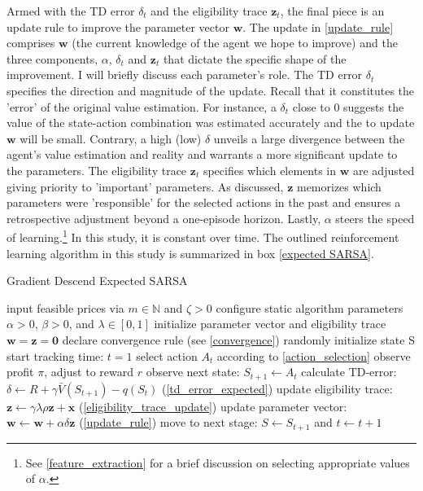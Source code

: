 Armed with the TD error $\delta_t$ and the eligibility trace $\boldsymbol{z}_t$, the final piece is an update rule to improve the parameter vector $\boldsymbol{w}$. The update in \autoref{update_rule} comprises $\boldsymbol{w}$  (the current knowledge of the agent we hope to improve) and the three components, $\alpha$, $\delta_t$ and $\boldsymbol{z}_t$ that dictate the specific shape of the improvement. I will briefly discuss each parameter's role. The TD error $\delta_t$ specifies the direction and magnitude of the update. Recall that it constitutes the 'error' of the original value estimation. For instance, a $\delta_t$ close to 0 suggests the value of the state-action combination was estimated accurately and the to update $\boldsymbol{w}$ will be small. Contrary, a high (low) $\delta$ unveils a large divergence between the agent's value estimation and reality and warrants a more significant update to the parameters. The eligibility trace $\boldsymbol{z}_t$ specifies which elements in $\boldsymbol{w}$ are adjusted giving priority to 'important' parameters. As discussed, $\boldsymbol{z}$ memorizes which parameters were 'responsible' for the selected actions in the past and ensures a retrospective adjustment beyond a one-episode horizon. Lastly, $\alpha$ steers the speed of learning.\footnote{See \autoref{feature_extraction} for a brief discussion on selecting appropriate values of $\alpha$.} In this study, it is constant over time. The outlined reinforcement learning algorithm in this study is summarized in box \autoref{expected SARSA}.

\begin{algorithm}
	\caption{Gradient Descend Expected SARSA}
	\begin{algorithmic}[testing]
		\label{expected SARSA}
		\small
		\STATE input feasible prices via $m \in \mathbb{N}$ and $\zeta > 0$
		\STATE configure static algorithm parameters $\alpha > 0$, $\beta > 0$, and $\lambda \in [0, 1]$
		\STATE initialize parameter vector and eligibility trace $\boldsymbol{w} = \boldsymbol{z} = \boldsymbol{0}$
		\STATE declare convergence rule (see \autoref{convergence})
		\STATE randomly initialize state S
		\STATE start tracking time: $t = 1$
		\STATE select action $A_t$ according to \autoref{action_selection}
		\STATE observe profit $\pi$, adjust to reward $r$
		\STATE observe next state: $S_{t+1} \leftarrow A_t$
		\STATE calculate TD-error: $\delta \leftarrow R +  \gamma \bar{V}(S_{t+1}) - q(S_t)$ (\autoref{td_error_expected})
		\STATE update eligibility trace: $\boldsymbol{z} \leftarrow \gamma \lambda \rho \boldsymbol{z} + \boldsymbol{x} $ (\autoref{eligibility_trace_update})
		\STATE update parameter vector: $\boldsymbol{w} \leftarrow \boldsymbol{w} + \alpha  \delta  \boldsymbol{z}$ (\autoref{update_rule})
		\STATE move to next stage: $S \leftarrow S_{t+1}$ and $t \leftarrow t+1$
		\ENDWHILE
	\end{algorithmic}
\end{algorithm}

